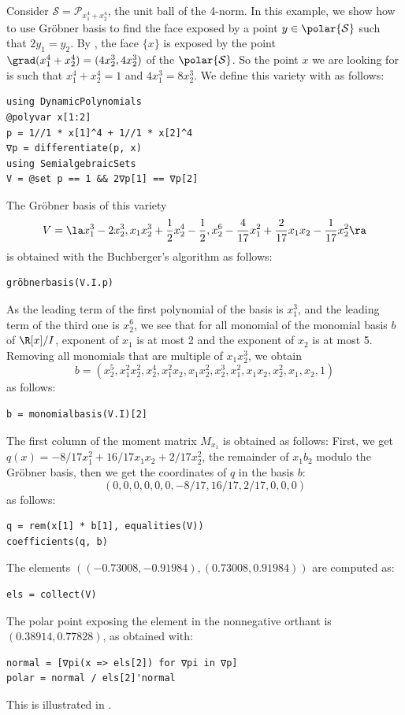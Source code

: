 \documentclass[11pt,twoside,a4paper,openright]{uclouvain-thesis}
\newcommand{\polyset}[1][p]{\mathcal{P}_{#1}}
\begin{document}
\begin{myexem}
  \label{exem:4normpolar}
  Consider $\mathcal{S} = \polyset[x_1^4 + x_2^4]$, the unit ball of the 4-norm.
  In this example, we show how to use Gr\"{o}bner basis to find the
  face exposed by a point $y \in \polar{\mathcal{S}}$ such that $2y_1 = y_2$.
  By , the face $\{x\}$ is exposed by the point $\grad (x_1^4 + x_2^4) = (4x_2^3, 4x_2^3)$
  of the $\polar{\mathcal{S}}$.
  So the point $x$ we are looking for is such that $x_1^4 + x_2^4 = 1$
  and $4x_1^3 = 8x_2^3$.
  We define this variety with  as follows:
\begin{verbatim}
using DynamicPolynomials
@polyvar x[1:2]
p = 1//1 * x[1]^4 + 1//1 * x[2]^4
∇p = differentiate(p, x)
using SemialgebraicSets
V = @set p == 1 && 2∇p[1] == ∇p[2]
\end{verbatim}
  The Gr\"{o}bner basis of this variety
  \[ V = \la
    x_1^3 - 2x_2^3,
    x_1x_2^3 + \frac{1}{2}x_2^4 - \frac{1}{2},
    x_2^6 - \frac{4}{17}x_1^2 + \frac{2}{17}x_1x_2 - \frac{1}{17}x_2^2
  \ra \]
  is obtained with the Buchberger's algorithm as follows:
\begin{verbatim}
gröbnerbasis(V.I.p)
\end{verbatim}
  As the leading term of the first polynomial of the basis is $x_1^3$,
  and the leading term of the third one is $x_2^6$, we see that
  for all monomial of the monomial basis $b$ of $\R[x] / I$,
  exponent of $x_1$ is at most 2 and the exponent of $x_2$ is at most 5.
  Removing all monomials that are multiple of $x_1x_2^3$, we obtain
  \[
    b = (x_2^5,
     x_1^2x_2^2,
     x_2^4,
     x_1^2x_2,
     x_1x_2^2,
     x_2^3,
     x_1^2,
     x_1x_2,
     x_2^2,
     x_1,
     x_2,
     1)
  \]
  as follows:
\begin{verbatim}
b = monomialbasis(V.I)[2]
\end{verbatim}
  The first column of the moment matrix $M_{x_1}$ is obtained as follows:
  First, we get $q(x) = -8/17x_1^2 + 16/17x_1x_2 + 2/17x_2^2$, the remainder of
  $x_1b_2$ modulo the Gr\"{o}bner basis,
  then we get the coordinates of $q$ in the basis $b$:
  \[ (0, 0, 0, 0, 0, 0,
     -8/17,
     16/17,
      2/17,
      0, 0, 0)
  \]
  as follows:
\begin{verbatim}
q = rem(x[1] * b[1], equalities(V))
coefficients(q, b)
\end{verbatim}
  The elements
  $((-0.73008,  %
     -0.91984), %
    ( 0.73008,
      0.91984))$
  are computed as:
\begin{verbatim}
els = collect(V)
\end{verbatim}
  The polar point exposing the element in the nonnegative orthant is
  $(0.38914,   %
    0.77828)$, %
  as obtained with:
\begin{verbatim}
normal = [∇pi(x => els[2]) for ∇pi in ∇p]
polar = normal / els[2]'normal
\end{verbatim}
  This is illustrated in .


\end{myexem}
\end{document}
